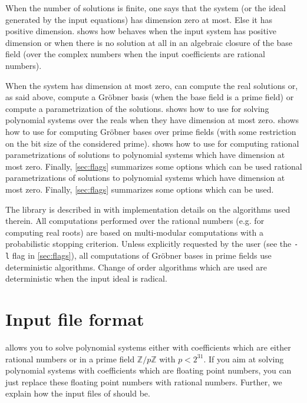 \documentclass[a4paper,english,11pt]{scrartcl}
\theoremstyle{definition}
\theoremstyle{remark}
\begin{document}
When the number of solutions is finite, one says that the system (or the ideal
generated by the input equations) has dimension zero at most. Else it has positive
dimension.
 shows how \msolve behaves when the input system has positive dimension
or when there is no solution at all in an algebraic closure of the base field (over
the complex numbers when the input coefficients are rational numbers).

When the system has dimension at most zero, \msolve can compute the real solutions
or, as said above, compute a Gr\"obner basis (when the base field is a prime field)
or compute a parametrization of the solutions.
 shows how to use \msolve for solving polynomial
systems over the reals when they have dimension at most zero.
 shows how to use \msolve for computing
Gr\"obner bases over prime fields (with some restriction on the bit size of the
considered prime).  shows how to use \msolve for computing rational
parametrizations of solutions to polynomial systems which have dimension at most
zero. Finally, \cref{sec:flags} summarizes some options which can be used rational
parametrizations of solutions to polynomial systems which have dimension at most
zero. Finally, \cref{sec:flags} summarizes some options which can be used.

The \msolve library is described in \cite{msolve} with implementation details on
the algorithms used therein. All computations performed over the rational numbers
(e.g. for computing real roots) are based on multi-modular computations with a
probabilistic stopping criterion. Unless explicitly requested by the user (see the
\verb+-l+ flag in \cref{sec:flags}), all computations of Gr\"obner bases
in prime fields use deterministic
algorithms. Change of order algorithms which are used are deterministic
when the input ideal is radical.

\section{Input file format}\label{sec:input}

\msolve allows you to solve polynomial systems either with coefficients
which are either rational numbers or in a prime field $\mathbb{Z}/p\mathbb{Z}$
with $p < 2^{31}$. If you aim at solving polynomial systems with coefficients
which are floating point numbers, you can just replace these floating point
numbers with rational numbers. Further, we explain how the input files of
\msolve should be.
\end{document}
